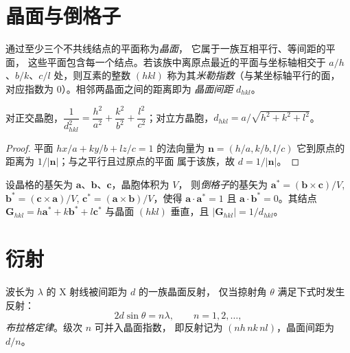 \section{晶面与倒格子}

\begin{definition}\label{def:b3:x-ray-diffraction:miller}
通过至少三个不共线结点的平面称为\emph{晶面}，
它属于一族互相平行、等间距的平面，
这些平面包含每一个结点。若该族中离原点最近的平面与坐标轴相交于
$a/h$、$b/k$、$c/l$ 处，则互素的整数 $(hkl)$
称为其\emph{米勒指数}（与某坐标轴平行的面，
对应指数为 0）。相邻两晶面之间的距离即为
\emph{晶面间距} $d_{hkl}$。
\end{definition}

\begin{proposition}[正交晶胞中的间距]\label{prop:b3:x-ray-diffraction:spacing}
对正交晶胞，$\dfrac{1}{d_{hkl}^2} = \dfrac{h^2}{a^2} + \dfrac{k^2}{b^2} +
\dfrac{l^2}{c^2}$；对立方晶胞，$d_{hkl} = a/\sqrt{h^2 + k^2 + l^2}$。
\end{proposition}

\begin{proof}
平面 $hx/a + ky/b + lz/c = 1$ 的法向量为 $\mathbf n = (h/a, k/b, l/c)$
它到原点的距离为 $1/|\mathbf n|$；与之平行且过原点的平面
属于该族，故 $d = 1/|\mathbf n|$。
\end{proof}

\begin{definition}[倒格子]\label{def:b3:x-ray-diffraction:reciprocal}
设晶格的基矢为 $\mathbf a$、$\mathbf b$、$\mathbf c$，晶胞体积为 $V$，
则\emph{倒格子}的基矢为
$\mathbf a^* = (\mathbf b\times\mathbf c)/V$, $\mathbf b^* = (\mathbf c\times\mathbf a)/V$,
$\mathbf c^* = (\mathbf a\times\mathbf b)/V$，使得 $\mathbf a\cdot\mathbf a^* = 1$ 且
$\mathbf a\cdot\mathbf b^* = 0$。其结点 $\mathbf G_{hkl} = h\mathbf a^* + k\mathbf b^* + l\mathbf c^*$
与晶面 $(hkl)$ 垂直，且 $|\mathbf G_{hkl}| = 1/d_{hkl}$。
\end{definition}

\section{衍射}

\begin{theorem}[布拉格定律]\label{thm:b3:x-ray-diffraction:bragg}
波长为 $\lambda$ 的 X 射线被间距为 $d$ 的一族晶面反射，
仅当掠射角 $\theta$ 满足下式时发生反射：
\[
2d\sin\theta = n\lambda, \qquad n = 1, 2, \dots,
\]
\emph{布拉格定律}。级次 $n$ 可并入晶面指数，
即反射记为 $(nh\,nk\,nl)$，晶面间距为 $d/n$。
\end{theorem}


